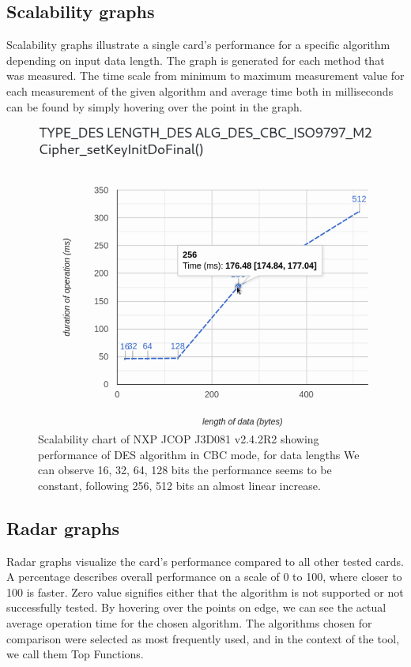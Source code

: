 \subsection{Scalability graphs}
Scalability graphs illustrate a single card's performance for a specific algorithm depending on input data length. The graph is generated for each method that was measured. The time scale from minimum to maximum measurement value for each measurement of the given algorithm and average time both in milliseconds can be found by simply hovering over the point in the graph.

\begin{figure}[H]
    \centering  
    \includegraphics[width=\textwidth-3.5cm]{img/NXP_JCOP_J3D081_v2.4.2R2 scalability graph.png}
    \caption{
    Scalability chart of NXP JCOP J3D081 v2.4.2R2 showing performance of DES algorithm in CBC mode, for data lengths We can observe 16, 32, 64, 128 bits the performance seems to be constant, following 256, 512 bits an almost linear increase.
    }
    \label{fig:scalability-chart}
\end{figure}

\subsection{Radar graphs}
Radar graphs visualize the card's performance compared to all other tested cards. A percentage describes overall performance on a scale of 0 to 100, where closer to 100 is faster. Zero value signifies either that the algorithm is not supported or not successfully tested. By hovering over the points on edge, we can see the actual average operation time for the chosen algorithm. The algorithms chosen for comparison were selected as most frequently used, and in the context of the tool, we call them Top Functions. 

